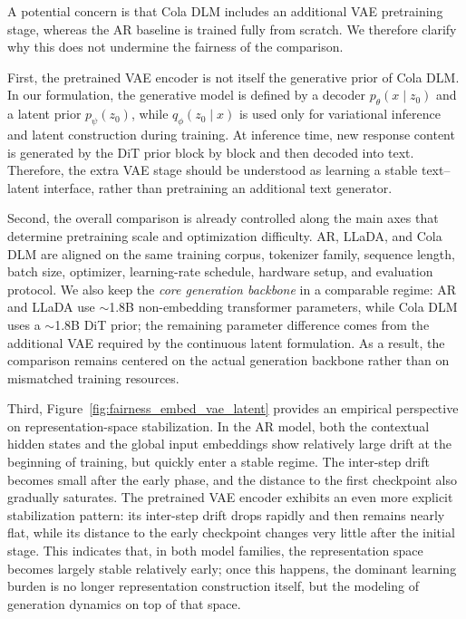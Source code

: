 A potential concern is that Cola DLM includes an additional VAE pretraining stage, whereas the AR baseline is trained fully from scratch. We therefore clarify why this does not undermine the fairness of the comparison.

First, the pretrained VAE encoder is not itself the generative prior of Cola DLM. In our formulation, the generative model is defined by a decoder $p_\theta(x \mid z_0)$ and a latent prior $p_\psi(z_0)$, while $q_\phi(z_0 \mid x)$ is used only for variational inference and latent construction during training. At inference time, new response content is generated by the DiT prior block by block and then decoded into text. Therefore, the extra VAE stage should be understood as learning a stable text--latent interface, rather than pretraining an additional text generator.

Second, the overall comparison is already controlled along the main axes that determine pretraining scale and optimization difficulty. AR, LLaDA, and Cola DLM are aligned on the same training corpus, tokenizer family, sequence length, batch size, optimizer, learning-rate schedule, hardware setup, and evaluation protocol. We also keep the \emph{core generation backbone} in a comparable regime: AR and LLaDA use $\sim$1.8B non-embedding transformer parameters, while Cola DLM uses a $\sim$1.8B DiT prior; the remaining parameter difference comes from the additional VAE required by the continuous latent formulation. As a result, the comparison remains centered on the actual generation backbone rather than on mismatched training resources.

Third, Figure~\ref{fig:fairness_embed_vae_latent} provides an empirical perspective on representation-space stabilization. In the AR model, both the contextual hidden states and the global input embeddings show relatively large drift at the beginning of training, but quickly enter a stable regime. The inter-step drift becomes small after the early phase, and the distance to the first checkpoint also gradually saturates. The pretrained VAE encoder exhibits an even more explicit stabilization pattern: its inter-step drift drops rapidly and then remains nearly flat, while its distance to the early checkpoint changes very little after the initial stage. This indicates that, in both model families, the representation space becomes largely stable relatively early; once this happens, the dominant learning burden is no longer representation construction itself, but the modeling of generation dynamics on top of that space.

